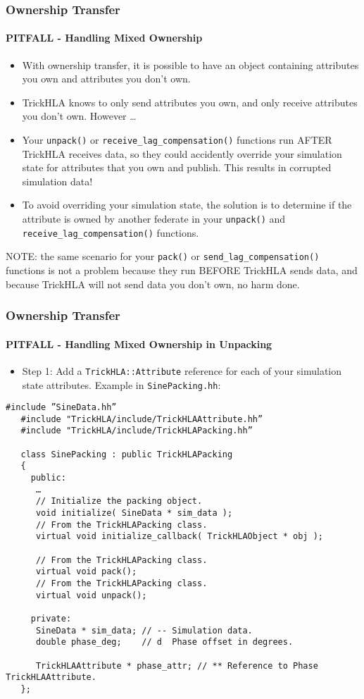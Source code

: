    \begin{frame}
      \frametitle{Ownership Transfer}
      \framesubtitle{PITFALL - Handling Mixed Ownership}
      \begin{itemize}
         \item With ownership transfer, it is possible to have an object
         containing attributes you own and attributes you don’t own.
         \item TrickHLA knows to only send attributes you own, and only receive
         attributes you don’t own. However \ldots
         \item Your \texttt{unpack()} or \texttt{receive\_lag\_compensation()}
         functions run AFTER TrickHLA receives data, so they could accidently
         override your simulation state for attributes that you own and publish.
         This results in corrupted simulation data!
         \item To avoid overriding your simulation state, the solution is to
         determine if the attribute is owned by another federate in your
         \texttt{unpack()} and \texttt{receive\_lag\_compensation()} functions.
      \end{itemize}
      \begin{footnotesize}
      NOTE: the same scenario for your \texttt{pack()} or
      \texttt{send\_lag\_compensation()} functions is not a problem because
      they run BEFORE TrickHLA sends data, and because TrickHLA will not
      send data you don’t own, no harm done.
      \end{footnotesize}
         
   \end{frame}

   \begin{frame}[fragile]
      \frametitle{Ownership Transfer}
      \framesubtitle{PITFALL - Handling Mixed Ownership in Unpacking}
      \begin{itemize}
         \item Step 1: Add a \texttt{TrickHLA::Attribute} reference for each of
         your simulation state attributes. Example in \texttt{SinePacking.hh}:
      \end{itemize}
\begin{Verbatim}[frame=single, fontsize=\tiny]
   #include ”SineData.hh”
   #include "TrickHLA/include/TrickHLAAttribute.hh”
   #include "TrickHLA/include/TrickHLAPacking.hh”

   class SinePacking : public TrickHLAPacking
   {
     public:
      …
      // Initialize the packing object.
      void initialize( SineData * sim_data );
      // From the TrickHLAPacking class.
      virtual void initialize_callback( TrickHLAObject * obj );

      // From the TrickHLAPacking class.
      virtual void pack();
      // From the TrickHLAPacking class.
      virtual void unpack();

     private:
      SineData * sim_data; // -- Simulation data.
      double phase_deg;    // d  Phase offset in degrees.

      TrickHLAAttribute * phase_attr; // ** Reference to Phase TrickHLAAttribute.
   };
\end{Verbatim}
   \end{frame}

